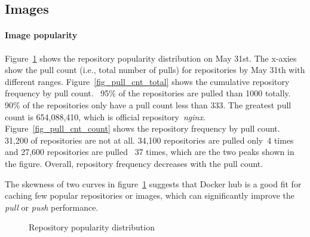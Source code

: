 \subsection{Images}
\label{sec:images}

\paragraph{Image popularity}
%
Figure~\ref{fig-pop} shows the repository popularity distribution on May 31st.
The x-axies show the pull count (i.e., total number of pulls) for repositories
by May 31th with different ranges.  
Figure~\ref{fig_pull_cnt_total} shows the
cumulative repository frequency by pull count. ~95\% of the repositories are
pulled than 1000 totally. 90\% of the repositories only have a pull count less
than 333. The greatest pull count is 654,088,410, which is official
repository~\textit{nginx}.  
Figure~\ref{fig_pull_cnt_count} shows the
repository frequency by pull count. 31,200 of repositories are not at all.
34,100 repositories are pulled only~4 times and 27,600 repositories are pulled
~37 times, which are the two peaks shown in the figure.  Overall, repository
frequency decreases with the pull count.

The skewness of two curves in figure~\ref{fig-pop} suggests that Docker hub is
a good fit for caching few popular repositories or images, which can
significantly improve the \textit{pull} or \textit{push} performance.      

\begin{figure}[!t]
	\centering
	\caption{Repository popularity distribution}
	\label{fig-pop}
\end{figure}
